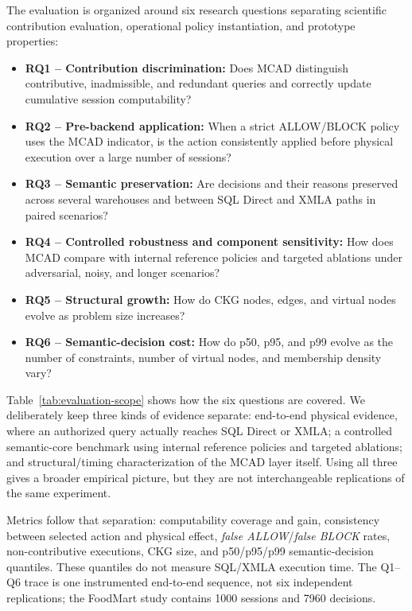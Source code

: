 \documentclass[journal]{IEEEtran}
\begin{document}
The evaluation is organized around six research questions separating scientific contribution evaluation, operational policy instantiation, and prototype properties:
\begin{itemize}
  \item \textbf{RQ1 -- Contribution discrimination:} Does MCAD distinguish contributive, inadmissible, and redundant queries and correctly update cumulative session computability?
  \item \textbf{RQ2 -- Pre-backend application:} When a strict ALLOW/BLOCK policy uses the MCAD indicator, is the action consistently applied before physical execution over a large number of sessions?
  \item \textbf{RQ3 -- Semantic preservation:} Are decisions and their reasons preserved across several warehouses and between SQL Direct and XMLA paths in paired scenarios?
  \item \textbf{RQ4 -- Controlled robustness and component sensitivity:} How does MCAD compare with internal reference policies and targeted ablations under adversarial, noisy, and longer scenarios?
  \item \textbf{RQ5 -- Structural growth:} How do CKG nodes, edges, and virtual nodes evolve as problem size increases?
  \item \textbf{RQ6 -- Semantic-decision cost:} How do p50, p95, and p99 evolve as the number of constraints, number of virtual nodes, and membership density vary?
\end{itemize}

Table~\ref{tab:evaluation-scope} shows how the six questions are covered. We deliberately keep three kinds of evidence separate: end-to-end physical evidence, where an authorized query actually reaches SQL Direct or XMLA; a controlled semantic-core benchmark using internal reference policies and targeted ablations; and structural/timing characterization of the MCAD layer itself. Using all three gives a broader empirical picture, but they are not interchangeable replications of the same experiment.



Metrics follow that separation: computability coverage and gain, consistency between selected action and physical effect, \emph{false ALLOW}/\emph{false BLOCK} rates, non-contributive executions, CKG size, and p50/p95/p99 semantic-decision quantiles. These quantiles do not measure SQL/XMLA execution time. The Q1--Q6 trace is one instrumented end-to-end sequence, not six independent replications; the FoodMart study contains 1000 sessions and 7960 decisions.
\end{document}
